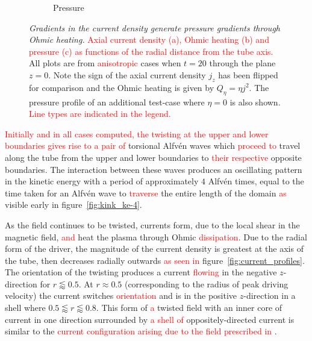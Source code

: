 \documentclass[12pt]{article}
\newcommand{\rs}[2]{\textcolor{red}{#2}}
\newcommand{\mycaption}[2]{\caption[#1]{\emph{#1} #2}}
\begin{document}
\begin{figure}[t]
\begin{subfigure}{0.32\textwidth}
      \caption{Pressure}
      \label{fig:pressure_profiles}
    \end{subfigure}
  \mycaption{Gradients in the current density generate pressure
    gradients through Ohmic heating.}{\rs{}{Axial current density (a), Ohmic heating
      (b) and pressure (c) as functions of the radial distance from
      the tube axis.}{} All plots are from \rs{switching}{anisotropic}
    cases when $t=20$ through the plane $z=0$. Note the sign of the
    axial current density $j_z$ has been flipped for comparison and
    the Ohmic heating is given by $Q_{\eta} = \eta j^2$. The pressure
    profile of an additional test-case where $\eta=0$ is also
    shown. \rs{}{Line types are indicated in the legend.}}%
  \label{fig:pressure_and_heating}
\end{figure}

\rs{In all cases, the initial reaction to the twisting at the upper
and lower boundaries is two}{Initially and in all cases computed, the
twisting at the upper and lower boundaries gives rise to a pair of}
torsional Alfv\'en waves which \rs{}{proceed to} travel along the tube
from the upper and lower boundaries to \rs{the}{their respective}
opposite boundaries. The interaction between these waves produces an 
oscillating pattern in the kinetic energy with a period of
approximately $4$ Alfv\'en times, equal to the time taken for an
Alfv\'en wave to \rs{travel}{traverse} the entire length of the domain
\rs{}{as} visible early in figure~\ref{fig:kink_ke-4}. 

As the field continues to be twisted, currents form, due to the local
shear in the magnetic field, \rs{which}{and} heat the plasma through Ohmic
\rs{heating}{dissipation}. Due to the radial form of the driver, the magnitude of the
current density is greatest at the axis of the tube, then decreases
radially outwards \rs{}{as seen in} figure~\ref{fig:current_profiles}. The orientation
of the twisting produces a current \rs{directed}{flowing} in the negative
$z$-direction for $r\lessapprox0.5$. At $r \approx 0.5$ (corresponding
to the radius of peak driving velocity) the current switches \rs{direction}{orientation}
and is in the positive $z$-direction in a shell where $0.5\lessapprox
r \lessapprox 0.8$. This form of \rs{}{a} twisted field with an inner core of
current in one direction surrounded by \rs{an}{a shell of}
oppositely-directed current is similar to the \rs{prescribed field in
chapter~}{current configuration arising due to the field prescribed in} \cite{quinnEffectAnisotropicViscosity2020}. 
\end{document}
